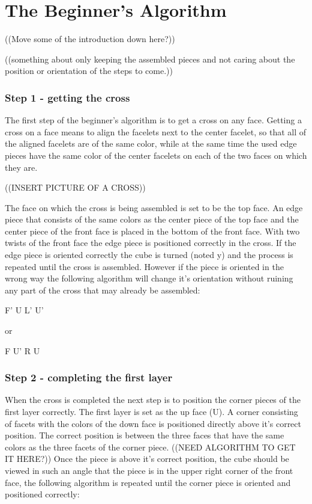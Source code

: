 \chapter{The Beginner's Algorithm}
\label{beginner}


((Move some of the introduction down here?))

((something about only keeping the assembled pieces and not caring about the position or orientation of the steps to come.))

\subsection{Step 1 - getting the cross}
The first step of the beginner's algorithm is to get a cross on any face. Getting a cross on a face means to align the facelets next to the center facelet, so that all of the aligned facelets are of the same color, while at the same time the used edge pieces have the same color of the center facelets on each of the two faces on which they are.

((INSERT PICTURE OF A CROSS))

The face on which the cross is being assembled is set to be the top face. An edge piece that consists of the same colors as the center piece of the top face and the center piece of the front face is placed in the bottom of the front face. With two twists of the front face the edge piece is positioned correctly in the cross. If the edge piece is oriented correctly the cube is turned (noted y) and the process is repeated until the cross is assembled. However if the piece is oriented in the wrong way the following algorithm will change it's orientation without ruining any part of the cross that may already be assembled:

F' U L' U'

or

F U' R U

\subsection{Step 2 - completing the first layer}
When the cross is completed the next step is to position the corner pieces of the first layer correctly. The first layer is set as the up face (U). A corner consisting of facets with the colors of the down face is positioned directly above it's correct  position. The correct position is between the three faces that have the same colors as the three facets of the corner piece. ((NEED ALGORITHM TO GET IT HERE?)) Once the piece is above it's correct position, the cube should be viewed in such an angle that the piece is in the upper right corner of the front face, the following algorithm is repeated until the corner piece is oriented and positioned correctly:

